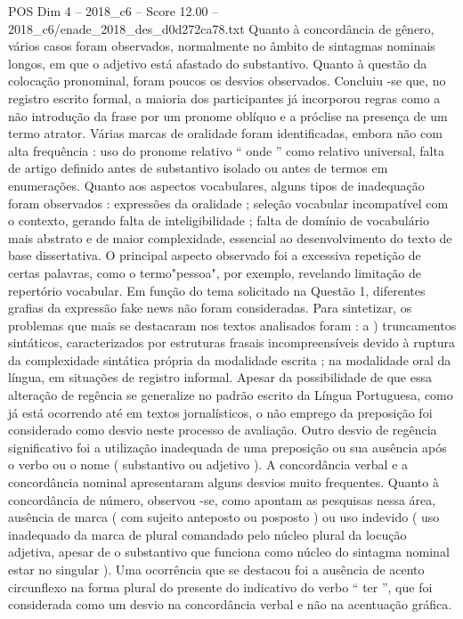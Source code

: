 \begin{textsample}{POS Dim 4 – 2018\_c6 – Score 12.00 – 2018\_c6/enade\_2018\_des\_d0d272ca78.txt}
Quanto à concordância de gênero, vários casos foram observados, normalmente no âmbito de sintagmas nominais longos, em que o adjetivo está afastado do substantivo.
Quanto à questão da colocação pronominal, foram poucos os desvios observados.
Concluiu -se que, no registro escrito formal, a maioria dos participantes já incorporou regras como a não introdução da frase por um pronome oblíquo e a próclise na presença de um termo atrator.
Várias marcas de oralidade foram identificadas, embora não com alta frequência : uso do pronome relativo “ onde ” como relativo universal, falta de artigo definido antes de substantivo isolado ou antes de termos em enumerações.
Quanto aos aspectos vocabulares, alguns tipos de inadequação foram observados : expressões da oralidade ; seleção vocabular incompatível com o contexto, gerando falta de inteligibilidade ; falta de domínio de vocabulário mais abstrato e de maior complexidade, essencial ao desenvolvimento do texto de base dissertativa.
O principal aspecto observado foi a excessiva repetição de certas palavras, como o termo"pessoa", por exemplo, revelando limitação de repertório vocabular.
Em função do tema solicitado na Questão 1, diferentes grafias da expressão fake news não foram consideradas.
Para sintetizar, os problemas que mais se destacaram nos textos analisados foram : a ) truncamentos sintáticos, caracterizados por estruturas frasais incompreensíveis devido à ruptura da complexidade sintática própria da modalidade escrita ; na modalidade oral da língua, em situações de registro informal.
Apesar da possibilidade de que essa alteração de regência se generalize no padrão escrito da Língua Portuguesa, como já está ocorrendo até em textos jornalísticos, o não emprego da preposição foi considerado como desvio neste processo de avaliação.
Outro desvio de regência significativo foi a utilização inadequada de uma preposição ou sua ausência após o verbo ou o nome ( substantivo ou adjetivo ).
A concordância verbal e a concordância nominal apresentaram alguns desvios muito frequentes.
Quanto à concordância de número, observou -se, como apontam as pesquisas nessa área, ausência de marca ( com sujeito anteposto ou posposto ) ou uso indevido ( uso inadequado da marca de plural comandado pelo núcleo plural da locução adjetiva, apesar de o substantivo que funciona como núcleo do sintagma nominal estar no singular ).
Uma ocorrência que se destacou foi a ausência de acento circunflexo na forma plural do presente do indicativo do verbo “ ter ”, que foi considerada como um desvio na concordância verbal e não na acentuação gráfica.

\end{textsample}
